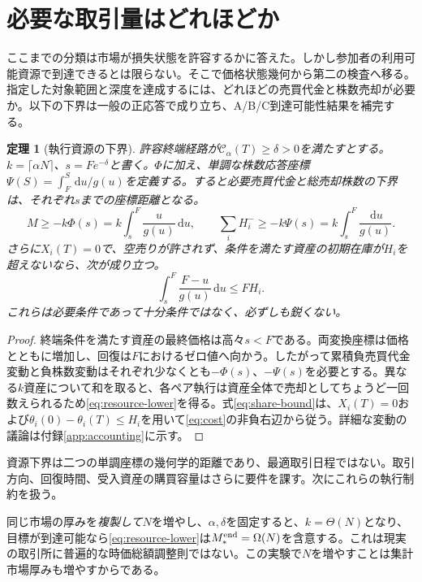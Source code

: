 \documentclass[11pt]{article}
\numberwithin{equation}{section}
\newtheorem{theorem}{定理}[section]
\theoremstyle{definition}
\theoremstyle{remark}
\newcommand{\Cris}{\mathcal{C}}
\newcommand{\dd}{\,\mathrm{d}}
\begin{document}
\section{必要な取引量はどれほどか}\label{sec:budget}
ここまでの分類は市場が損失状態を許容するかに答えた。しかし参加者の利用可能資源で到達できるとは限らない。そこで価格状態幾何から第二の検査へ移る。指定した対象範囲と深度を達成するには、どれほどの売買代金と株数売却が必要か。以下の下界は一般の正応答で成り立ち、A/B/C到達可能性結果を補完する。

\begin{theorem}[執行資源の下界]\label{thm:resource}
許容終端経路が$\Cris_\alpha(T)\ge\delta>0$を満たすとする。$k=\lceil\alpha N\rceil$、$s=Fe^{-\delta}$と書く。$\Phi$に加え、単調な株数応答座標$\Psi(S)=\int_F^S\dd u/g(u)$を定義する。すると必要売買代金と総売却株数の下界は、それぞれ$s$までの座標距離となる。
\begin{equation}\label{eq:resource-lower}
\boxed{M\ge -k\Phi(s)=k\int_s^F\frac{u}{g(u)}\dd u,\qquad
\sum_iH_i^-\ge -k\Psi(s)=k\int_s^F\frac{\dd u}{g(u)}.}
\end{equation}
さらに$X_i(T)=0$で、空売りが許されず、条件を満たす資産の初期在庫が$H_i$を超えないなら、次が成り立つ。
\begin{equation}\label{eq:share-bound}
\boxed{\int_s^F\frac{F-u}{g(u)}\dd u\le FH_i.}
\end{equation}
これらは必要条件であって十分条件ではなく、必ずしも鋭くない。
\end{theorem}
\begin{proof}
終端条件を満たす資産の最終価格は高々$s<F$である。両変換座標は価格とともに増加し、回復は$F$におけるゼロ値へ向かう。したがって累積負売買代金変動と負株数変動はそれぞれ少なくとも$-\Phi(s)$、$-\Psi(s)$を必要とする。異なる$k$資産について和を取ると、各ペア執行は資産全体で売却としてちょうど一回数えられるため\eqref{eq:resource-lower}を得る。式\eqref{eq:share-bound}は、$X_i(T)=0$および$\theta_i(0)-\theta_i(T)\le H_i$を用いて\eqref{eq:cost}の非負右辺から従う。詳細な変動の議論は付録\ref{app:accounting}に示す。
\end{proof}

資源下界は二つの単調座標の幾何学的距離であり、最適取引日程ではない。取引方向、回復時間、受入資産の購買容量はさらに要件を課す。次にこれらの執行制約を扱う。

同じ市場の厚みを\emph{複製して}$N$を増やし、$\alpha,\delta$を固定すると、$k=\Theta(N)$となり、目標が到達可能なら\eqref{eq:resource-lower}は$M_*^{\rm end}=\Omega(N)$を含意する。これは現実の取引所に普遍的な時価総額調整則ではない。この実験で$N$を増やすことは集計市場厚みも増やすからである。
\end{document}
